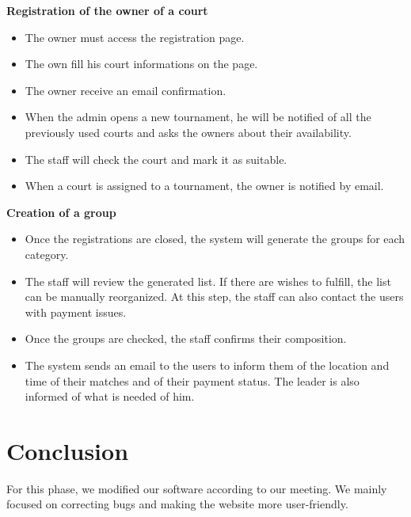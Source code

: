\documentclass[a4paper, 12pt]{article}
\begin{document}
\textbf{Registration of the owner of a court}

\begin{itemize}
	\item The owner must access the registration page.
	\item The own fill his court informations on the page.
	\item The owner receive an email confirmation.
	\item When the admin opens a new tournament, he will be notified of all the previously used courts and asks the owners about their availability.
	\item The staff will check the court and mark it as suitable.
	\item When a court is assigned to a tournament, the owner is notified by email.
\end{itemize}


\textbf{Creation of a group}

\begin{itemize}
	\item Once the registrations are closed, the system will generate the groups for each category.
	\item The staff will review the generated list. If there are wishes to fulfill, the list can be manually reorganized. At this step, the staff can also contact the users with payment issues.
	\item Once the groups are checked, the staff confirms their composition.
	\item The system sends an email to the users to inform them of the location and time of their matches and of their payment status. The leader is also informed of what is needed of him.
\end{itemize}

\section{Conclusion}

For this phase, we modified our software according to our meeting. We mainly focused on correcting bugs and making the website more user-friendly.
\end{document}
